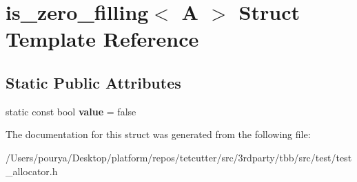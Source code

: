 \hypertarget{structis__zero__filling}{}\section{is\+\_\+zero\+\_\+filling$<$ A $>$ Struct Template Reference}
\label{structis__zero__filling}
\subsection*{Static Public Attributes}
\begin{DoxyCompactItemize}
\item 
\hypertarget{structis__zero__filling_a8be2076a5bc7d893e84bb26b9e02bca4}{}static const bool {\bfseries value} = false\label{structis__zero__filling_a8be2076a5bc7d893e84bb26b9e02bca4}

\end{DoxyCompactItemize}


The documentation for this struct was generated from the following file\+:\begin{DoxyCompactItemize}
\item 
/\+Users/pourya/\+Desktop/platform/repos/tetcutter/src/3rdparty/tbb/src/test/test\+\_\+allocator.\+h\end{DoxyCompactItemize}
